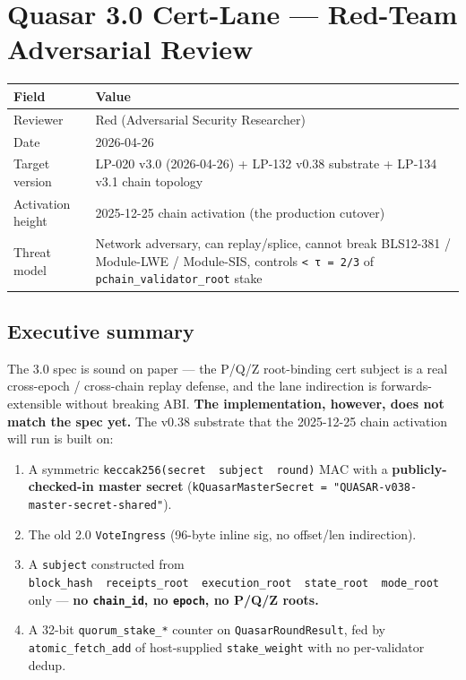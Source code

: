 \documentclass[
]{article}
\author{}
\date{}
\newcounter{none} %
\providecommand{\tightlist}{%
  \setlength{\itemsep}{0pt}\setlength{\parskip}{0pt}}
\begin{document}
\section{Quasar 3.0 Cert-Lane --- Red-Team Adversarial
Review}\label{quasar-30-cert-lane--red-team-adversarial-review}

{\def\LTcaptype{none} %
\begin{longtable}[]{@{}ll@{}}
\toprule\noalign{}
Field & Value \\
\midrule\noalign{}
\endhead
\bottomrule\noalign{}
\endlastfoot
Reviewer & Red (Adversarial Security Researcher) \\
Date & 2026-04-26 \\
Target version & LP-020 v3.0 (2026-04-26) + LP-132 v0.38 substrate +
LP-134 v3.1 chain topology \\
Activation height & 2025-12-25 chain activation (the production
cutover) \\
Threat model & Network adversary, can replay/splice, cannot break
BLS12-381 / Module-LWE / Module-SIS, controls
\texttt{\textless{}\ τ\ =\ 2/3} of \texttt{pchain\_validator\_root}
stake \\
\end{longtable}
}

\subsection{Executive summary}\label{executive-summary}

The 3.0 spec is sound on paper --- the P/Q/Z root-binding cert subject
is a real cross-epoch / cross-chain replay defense, and the lane
indirection is forwards-extensible without breaking ABI. \textbf{The
implementation, however, does not match the spec yet.} The v0.38
substrate that the 2025-12-25 chain activation will run is built on:

\begin{enumerate}
\def\labelenumi{\arabic{enumi}.}
\tightlist
\item
  A symmetric
  \texttt{keccak256(secret\ \textbar{}\textbar{}\ subject\ \textbar{}\textbar{}\ round)}
  MAC with a \textbf{publicly-checked-in master secret}
  (\texttt{kQuasarMasterSecret\ =\ "QUASAR-v038-master-secret-shared"}).
\item
  The old 2.0 \texttt{VoteIngress} (96-byte inline sig, no offset/len
  indirection).
\item
  A \texttt{subject} constructed from
  \texttt{block\_hash\ \textbar{}\textbar{}\ receipts\_root\ \textbar{}\textbar{}\ execution\_root\ \textbar{}\textbar{}\ state\_root\ \textbar{}\textbar{}\ mode\_root}
  only --- \textbf{no \texttt{chain\_id}, no \texttt{epoch}, no P/Q/Z
  roots.}
\item
  A 32-bit \texttt{quorum\_stake\_*} counter on
  \texttt{QuasarRoundResult}, fed by \texttt{atomic\_fetch\_add} of
  host-supplied \texttt{stake\_weight} with no per-validator dedup.
\end{enumerate}
\end{document}
